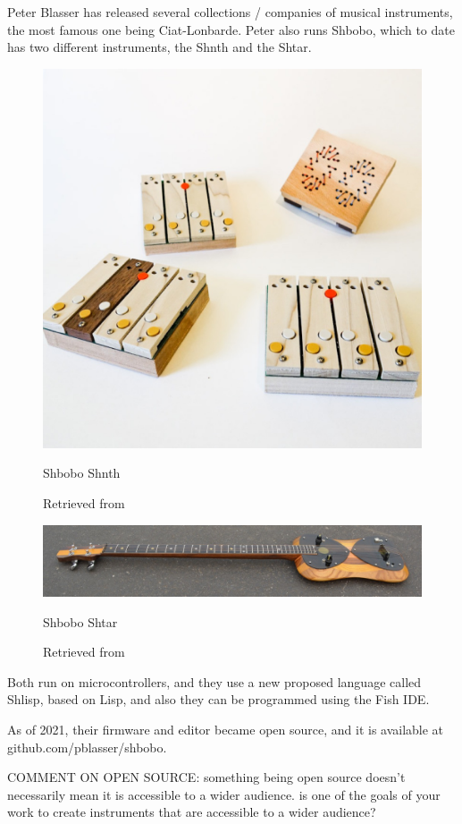 Peter Blasser has released several collections / companies of musical instruments, the most famous one being Ciat-Lonbarde. Peter also runs Shbobo, which to date has two different instruments, the Shnth and the Shtar.

\begin{figure}[ht]
  \centering
  \includegraphics[width=0.75\linewidth,height=0.25\textheight,keepaspectratio]{images/shbobo-shnth.jpg}
  \caption{Shbobo Shnth}
  \caption*{Retrieved from \cite{website-shbobo-current}}
  \label{fig:shbobo-shnth}
\end{figure}

\begin{figure}[ht]
  \centering
    \includegraphics[width=0.75\linewidth,height=0.25\textheight,keepaspectratio]{images/shbobo-shtar.jpg}
  \caption{Shbobo Shtar}
  \caption*{Retrieved from \cite{website-shbobo-current}}
  \label{fig:shbobo-shtar}
\end{figure}

Both run on microcontrollers, and they use a new proposed language called Shlisp, based on Lisp, and also they can be programmed using the Fish IDE.

As of 2021, their firmware and editor became open source, and it is available at github.com/pblasser/shbobo.

COMMENT ON OPEN SOURCE: something being open source doesn't necessarily mean it is accessible to a wider audience. is one of the goals of your work to create instruments that are accessible to a wider audience?

